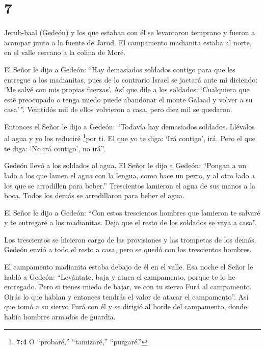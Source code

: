 \hypertarget{section-6}{%
\section{7}\label{section-6}}

 Jerub-baal (Gedeón) y los que estaban con él se levantaron
temprano y fueron a acampar junto a la fuente de Jarod. El campamento
madianita estaba al norte, en el valle cercano a la colina de Moré.

 El Señor le dijo a Gedeón: ``Hay demasiados soldados
contigo para que les entregue a los madianitas, pues de lo contrario
Israel se jactará ante mí diciendo: `Me salvé con mis propias fuerzas'.
 Así que dile a los soldados: `Cualquiera que esté
preocupado o tenga miedo puede abandonar el monte Galaad y volver a su
casa'\,''. Veintidós mil de ellos volvieron a casa, pero diez mil se
quedaron.

 Entonces el Señor le dijo a Gedeón: ``Todavía hay
demasiados soldados. Llévalos al agua y yo los reduciré \footnote{\textbf{7:4}
  O ``probaré,'' ``tamizaré,'' ``purgaré.''}por ti. El que yo te diga:
`Irá contigo', irá. Pero el que te diga: `No irá contigo', no irá''.

 Gedeón llevó a los soldados al agua. El Señor le dijo a
Gedeón: ``Pongan a un lado a los que lamen el agua con la lengua, como
hace un perro, y al otro lado a los que se arrodillen para beber.''
 Trescientos lamieron el agua de sus manos a la boca. Todos
los demás se arrodillaron para beber el agua.

 El Señor le dijo a Gedeón: ``Con estos trescientos hombres
que lamieron te salvaré y te entregaré a los madianitas. Deja que el
resto de los soldados se vaya a casa''.

 Los trescientos se hicieron cargo de las provisiones y las
trompetas de los demás. Gedeón envió a todo el resto a casa, pero se
quedó con los trescientos hombres.

El campamento madianita estaba debajo de él en el valle. 
Esa noche el Señor le habló a Gedeón: ``Levántate, baja y ataca el
campamento, porque te lo he entregado.  Pero si tienes
miedo de bajar, ve con tu siervo Furá al campamento.  Oirás
lo que hablan y entonces tendrás el valor de atacar el campamento''. Así
que tomó a su siervo Furá con él y se dirigió al borde del campamento,
donde había hombres armados de guardia.

